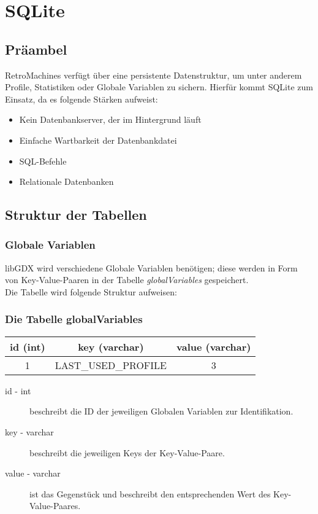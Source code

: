 \section{SQLite}

\subsection{Präambel}

RetroMachines verfügt über eine persistente Datenstruktur, um unter anderem Profile, Statistiken oder Globale Variablen zu sichern. Hierfür kommt SQLite zum Einsatz, da es folgende Stärken aufweist:

\begin{itemize}
	\item Kein Datenbankserver, der im Hintergrund läuft
	\item Einfache Wartbarkeit der Datenbankdatei
	\item SQL-Befehle
	\item Relationale Datenbanken
\end{itemize}

\subsection{Struktur der Tabellen}

\subsubsection{Globale Variablen}

libGDX wird verschiedene Globale Variablen benötigen; diese werden in Form von Key-Value-Paaren in der Tabelle \textit{globalVariables} gespeichert. \\ 
Die Tabelle wird folgende Struktur aufweisen:

{\center
\subsubsection*{Die Tabelle globalVariables}
\begin{tabular}{ccc}
	\hline
	id (int) & key (varchar) & value (varchar) \\
	\hline
	1 & LAST\_USED\_PROFILE & 3 \\
	\hline
\end{tabular}
\par
}

\begin{description}
	\item[id - int] beschreibt die ID der jeweiligen Globalen Variablen zur Identifikation.
	\item[key - varchar] beschreibt die jeweiligen Keys der Key-Value-Paare.
	\item[value - varchar] ist das Gegenstück und beschreibt den entsprechenden Wert des Key-Value-Paares.
\end{description}

